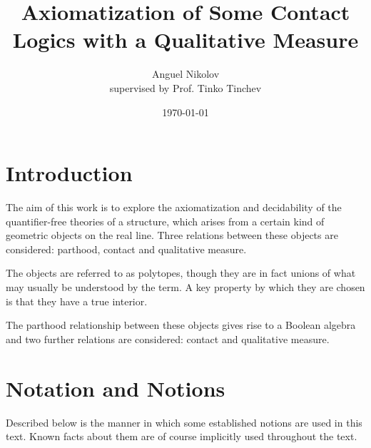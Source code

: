 \documentclass{article}
\title{Axiomatization of Some Contact Logics with a Qualitative Measure}
\author{Anguel Nikolov\\{\small supervised by Prof. Tinko Tinchev}}
\affil{Faculty of Mathematics and Informatics \\
  Sofia University ``St. Kliment Ohridski''}
\date{\today}
\begin{document}
\maketitle

\section{Introduction}

The aim of this work is to explore the axiomatization and decidability of the quantifier-free theories of a structure, which arises from a certain kind of geometric objects on the real line. Three relations between these objects are considered: parthood, contact and qualitative measure.

The objects are referred to as polytopes, though they are in fact unions of what may usually be understood by the term. A key property by which they are chosen is that they have a true interior.

The parthood relationship between these objects gives rise to a Boolean algebra and two further relations are considered: contact and qualitative measure.
\section{Notation and Notions}
Described below is the manner in which some established notions are used in this text. Known facts about them are of course implicitly used throughout the text.
\end{document}
